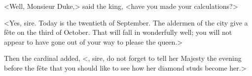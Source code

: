 <Well, Monsieur Duke,> said the king, <have you made your calculations?> 

<Yes, sire. Today is the twentieth of September. The aldermen of the city give a fête on the third of October. That will fall in wonderfully well; you will not appear to have gone out of your way to please the queen.> 

Then the cardinal added, <, sire, do not forget to tell her Majesty the evening before the fête that you should like to see how her diamond studs become her.>